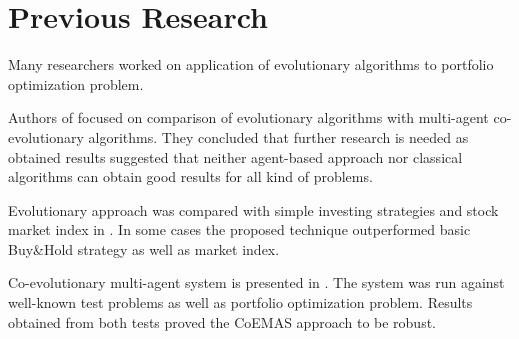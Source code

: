 
\section{Previous Research}
\label{sec:previous-research}

Many researchers worked on application of evolutionary algorithms to portfolio optimization problem.

Authors of \cite{Drezewski:2009:CMC:1533570.1533599} focused on comparison of evolutionary algorithms with multi-agent co-evolutionary algorithms.
They concluded that further research is needed as obtained results suggested that neither agent-based approach nor classical algorithms can obtain good results
for all kind of problems.

Evolutionary approach was compared with simple investing strategies and stock market index in \cite{Lipinski:2009:BRP:1574739.1574764}.
In some cases the proposed technique outperformed basic Buy\&Hold strategy as well as market index.

Co-evolutionary multi-agent system is presented in \cite{Drezewski:2009:MOT:1574739.1574761}.
The system was run against well-known test problems as well as portfolio optimization problem.
Results obtained from both tests proved the CoEMAS approach to be robust. 